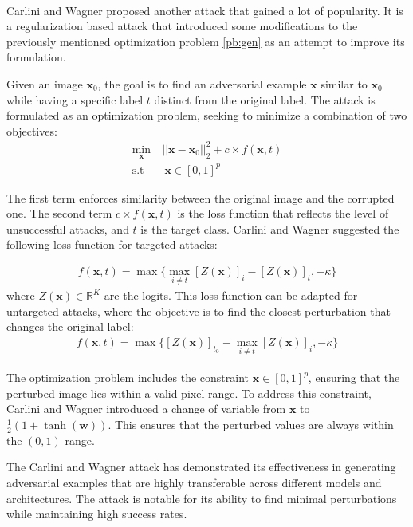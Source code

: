 \documentclass[10pt,twocolumn,letterpaper]{article}
\begin{document}
\paragraph{}
Carlini and Wagner proposed another attack \cite{robustness} that gained a lot of popularity. It is a regularization based attack that introduced some modifications to the previously mentioned optimization problem \ref{pb:gen} as an attempt to improve its formulation.

Given an image $\bm{x}_0$, the goal is to find an adversarial example $\bm{x}$ similar to $\bm{x}_0$ while having a specific label $t$ distinct from the original label. The attack is formulated as an optimization problem, seeking to minimize a combination of two objectives:
\begin{align*}
   \min_{\bm{x}} &\ ||\bm{x} - \bm{x}_0||_2^2 + c \times f(\bm{x}, t) \\
     \text{s.t } &\ \ \bm{x} \in [0,1]^p
\end{align*}

The first term enforces similarity between the original image and the corrupted one. The second term $ c \times f(\bm{x}, t)$ is the loss function that reflects the level of unsuccessful attacks, and $t$ is the target class. Carlini and Wagner suggested the following loss function for targeted attacks:

\begin{align*}
    f(\bm{x}, t) = \max \{ \max_{i \neq t}[Z(\bm{x})]_i - [Z(\bm{x})]_t, -\kappa \}
\end{align*}
where $Z(\bm{x}) \in \mathbb{R}^K$ are the logits. 
This loss function can be adapted for untargeted attacks, where the objective is to find the closest perturbation that changes the original label:
\begin{align*}
    f(\bm{x}, t) = \max \{[Z(\bm{x})]_{t_0} - \max_{i \neq t}[Z(\bm{x})]_i, -\kappa \}
\end{align*}

The optimization problem includes the constraint $\bm{x} \in [0,1]^p $, ensuring that the perturbed image lies within a valid pixel range. To address this constraint, Carlini and Wagner introduced a change of variable from $\bm{x}$ to $\frac{1}{2} (1 + \tanh(\bm{w}))$.  This ensures that the perturbed values are always within the $(0,1)$ range.

The Carlini and Wagner attack has demonstrated its effectiveness in generating adversarial examples that are highly transferable across different models and architectures. The attack is notable for its ability to find minimal perturbations while maintaining high success rates.
\end{document}
